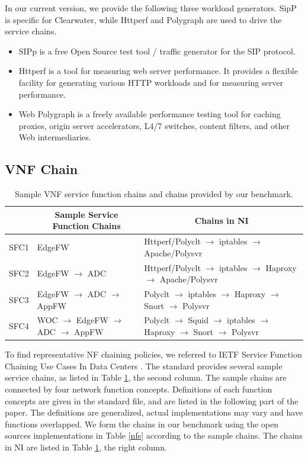 In our current version, we provide the following three workload generators.
SipP is specific for Clearwater, 
while Httperf and Polygraph are used to drive the service chains.
\begin{itemize}
\item{}
SIPp \cite{SIPp}
is a free Open Source test tool / traffic generator for the SIP protocol.
\item{}
Httperf \cite{Httperf}
is a tool for measuring web server performance. It provides a flexible facility for generating various HTTP workloads and for measuring server performance.
\item{}
Web Polygraph \cite{web-polygraph}
is a freely available performance testing tool for caching proxies, origin server accelerators, L4/7 switches, content filters, and other Web intermediaries.
\end{itemize}

\subsection{VNF Chain}

\begin{table}[!t]
\newcommand{\tabincell}[2]{\begin{tabular}{@{}#1@{}}#2\end{tabular}}
\centering
\begin{tabular}{|l|l|l|}\hline
\textbf{} & \multicolumn{1}{c|}{\textbf{Sample Service Function Chains}} & \multicolumn{1}{c|}{\textbf{Chains in NI}} \\\hline
SFC1 & EdgeFW & Httperf/Polyclt $\to$ iptables $\to$ Apache/Polysvr \\\hline
SFC2 & EdgeFW $\to$ ADC & Httperf/Polyclt $\to$ iptables $\to$ Haproxy $\to$ Apache/Polysvr \\\hline
SFC3 & EdgeFW $\to$ ADC $\to$ AppFW & Polyclt $\to$ iptables $\to$ Haproxy $\to$ Snort $\to$ Polysvr \\\hline
SFC4 & WOC $\to$ EdgeFW $\to$ ADC $\to$ AppFW & Polyclt $\to$  Squid $\to$ iptables $\to$ Haproxy $\to$ Snort $\to$ Polysvr \\\hline
\end{tabular}
\caption{Sample VNF service function chains and chains provided by our benchmark.}
\label{chains}
\end{table}

To find representative NF chaining policies,
we referred to IETF Service Function Chaining Use Cases
In Data Centers \cite{draft-ietf-sfc-dc-use-cases-06}.
The standard provides several sample service chains,
as listed in Table \ref{chains}, the second column.
The sample chains are connected by four network function concepts.
Definitions of each function concepts are given in the standard file,
and are listed in the following part of the paper.
The definitions are generalized,
actual implementations may vary and have functions overlapped.
We form the chains in our benchmark using the open sources
implementations in Table \ref{nfs} according to the sample chains.
The chains in NI are listed in Table \ref{chains}, the right column.

